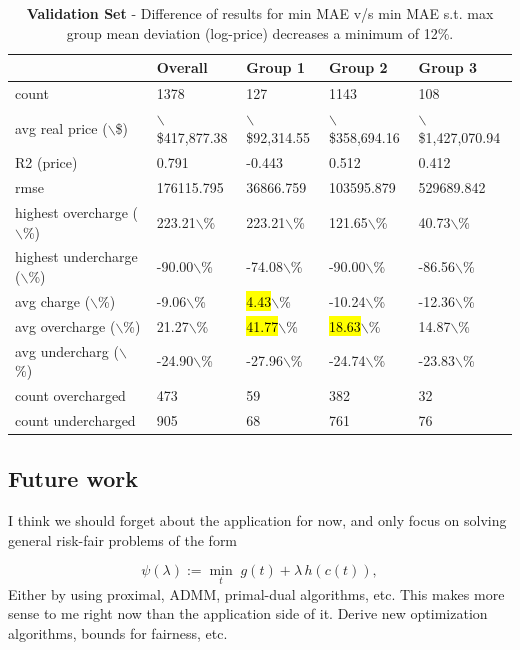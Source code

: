 \documentclass{article}
\begin{document}
\begin{table}[!ht]
    \begin{tabular}{|l|l|l|l|l|}
    \hline
        ~ & Overall & Group 1 & Group 2 & Group 3 \\ \hline
        count & 1378 & 127 & 1143 & 108 \\ \hline
        avg real price ($\backslash$\$) & $\backslash$\$417,877.38 & $\backslash$\$92,314.55 & $\backslash$\$358,694.16 & $\backslash$\$1,427,070.94 \\ \hline
        R2 (price) & 0.791 & -0.443 & 0.512 & 0.412 \\ \hline
        rmse & 176115.795 & 36866.759 & 103595.879 & 529689.842 \\ \hline
        highest overcharge ($\backslash$\%) & 223.21$\backslash$\% & 223.21$\backslash$\% & 121.65$\backslash$\% & 40.73$\backslash$\% \\ \hline
        highest undercharge ($\backslash$\%) & -90.00$\backslash$\% & -74.08$\backslash$\% & -90.00$\backslash$\% & -86.56$\backslash$\% \\ \hline
        avg charge ($\backslash$\%) & -9.06$\backslash$\% & \hl{4.43}$\backslash$\% & -10.24$\backslash$\% & -12.36$\backslash$\% \\ \hline
        avg overcharge ($\backslash$\%) & 21.27$\backslash$\% & \hl{41.77}$\backslash$\% & \hl{18.63}$\backslash$\% & 14.87$\backslash$\% \\ \hline
        avg undercharg ($\backslash$\%) & -24.90$\backslash$\% & -27.96$\backslash$\% & -24.74$\backslash$\% & -23.83$\backslash$\% \\ \hline
        count overcharged & 473 & 59 & 382 & 32 \\ \hline
        count undercharged & 905 & 68 & 761 & 76 \\ \hline
    \end{tabular}
    \caption{\textbf{Validation Set} - Difference of results for min MAE v/s min MAE s.t. max group mean deviation (log-price) decreases a minimum of 12\%.}
    \label{tab4:val_summary}
\end{table}


\subsection*{Future work}

I think we should forget about the application for now, and only focus on solving general risk-fair problems of the form

\[
\psi(\lambda):=\min_{t}\; g(t)+\lambda\,h(c(t)),
\]
Either by using proximal, ADMM, primal-dual algorithms, etc. This makes more sense to me right now than the application side of it. Derive new optimization algorithms, bounds for fairness, etc.
\end{document}
